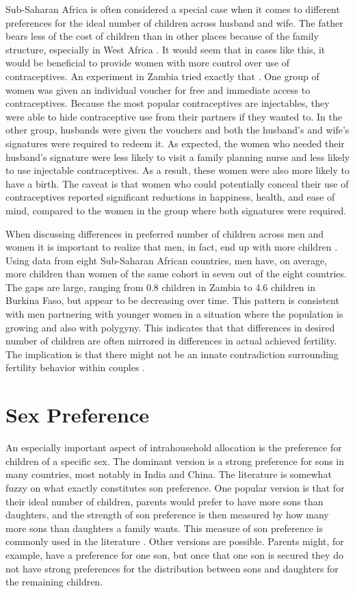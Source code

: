 \documentclass[letterpaper,12pt]{article}
\begin{document}
Sub-Saharan Africa is often considered a special case when it comes to
different preferences for the ideal number of children across husband
and wife.
The father bears less of the cost of children than in other places
because of the family structure, especially in West Africa
\citep{Caldwell1992}.
It would seem that in cases like this, it would be beneficial to provide
women with more control over use of contraceptives.
An experiment in Zambia tried exactly that \citep{Ashraf2014}.
One group of women was given an individual voucher for free and
immediate access to contraceptives.
Because the most popular contraceptives are injectables, they were able
to hide contraceptive use from their partners if they wanted to.
In the other group, husbands were given the vouchers and both the
husband's and wife's signatures were required to redeem it.
As expected, the women who needed their husband's signature were less
likely to visit a family planning nurse and less likely to use
injectable contraceptives.
As a result, these women were also more likely to have a birth.
The caveat is that women who could potentially conceal their use of
contraceptives reported significant reductions in happiness, health, and
ease of mind, compared to the women in the group where both signatures
were required.

When discussing differences in preferred number of children across men
and women it is important to realize that men, in fact, end up with more
children \citep{Field2016}.
Using data from eight Sub-Saharan African countries, men have, on
average, more children than women of the same cohort in seven out of the
eight countries.
The gaps are large, ranging from 0.8 children in Zambia to 4.6 children
in Burkina Faso, but appear to be decreasing over time.
This pattern is consistent with men partnering with younger women in a
situation where the population is growing and also with polygyny.
This indicates that that differences in desired number of children are
often mirrored in differences in actual achieved fertility.
The implication is that there might not be an innate contradiction
surrounding fertility behavior within couples \citep{Field2016}.

\section{Sex Preference}

An especially important aspect of intrahousehold allocation is the
preference for children of a specific sex.
The dominant version is a strong preference for sons in many countries,
most notably in India and China.
The literature is somewhat fuzzy on what exactly constitutes son
preference.
One popular version is that for their ideal number of children, parents
would prefer to have more sons than daughters, and the strength of son
preference is then measured by how many more sons than daughters a
family wants.
This measure of son preference is commonly used in the literature
\citep[e.g.]{clark00,Jensen2009,Hu2015}.
Other versions are possible.
Parents might, for example, have a preference for one son, but once that
one son is secured they do not have strong preferences for the
distribution between sons and daughters for the remaining children.
\end{document}
